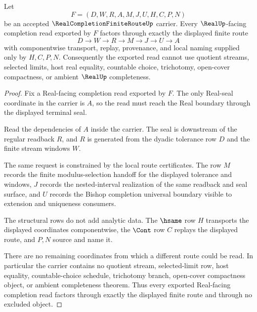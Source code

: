 \begin{theorem}
\label{thm:real-completion-finite-route-determinacy}
Let
$$
F=(D,W,R,A,M,J,U,H,C,P,N)
$$
be an accepted $\RealCompletionFiniteRouteUp$ carrier. Every $\RealUp$-facing completion read exported by $F$ factors through exactly the displayed finite route
$$
D \longrightarrow W \longrightarrow R \longrightarrow M \longrightarrow J \longrightarrow U \longrightarrow A
$$
with componentwise transport, replay, provenance, and local naming supplied only by $H,C,P,N$. Consequently the exported read cannot use quotient streams, selected limits, host real equality, countable choice, trichotomy, open-cover compactness, or ambient $\RealUp$ completeness.
\end{theorem}
\begin{proof}
Fix a Real-facing completion read exported by $F$. The only Real-seal coordinate in the carrier is $A$, so the read must reach the Real boundary through the displayed terminal seal.

Read the dependencies of $A$ inside the carrier. The seal is downstream of the regular readback $R$, and $R$ is generated from the dyadic tolerance row $D$ and the finite stream windows $W$.

The same request is constrained by the local route certificates. The row $M$ records the finite modulus-selection handoff for the displayed tolerance and windows, $J$ records the nested-interval realization of the same readback and seal surface, and $U$ records the Bishop completion universal boundary visible to extension and uniqueness consumers.

The structural rows do not add analytic data. The $\hsame$ row $H$ transports the displayed coordinates componentwise, the $\Cont$ row $C$ replays the displayed route, and $P,N$ source and name it.

There are no remaining coordinates from which a different route could be read. In particular the carrier contains no quotient stream, selected-limit row, host equality, countable-choice schedule, trichotomy branch, open-cover compactness object, or ambient completeness theorem. Thus every exported Real-facing completion read factors through exactly the displayed finite route and through no excluded object.
\end{proof}

